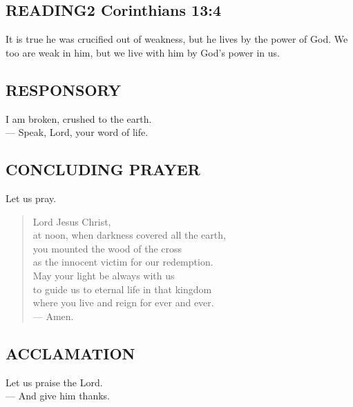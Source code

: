 \documentclass[12pt,twocolumn,letterpaper]{book}
\begin{document}
\subsection*{READING\hfill \normalsize 2 Corinthians 13:4}

It is true he was crucified out of weakness, but he lives by the power of God. We too are weak in him, but we live with him by God’s power in us.

\subsection*{RESPONSORY}
I am broken, crushed to the earth.\\
— Speak, Lord, your word of life.

\subsection*{CONCLUDING PRAYER}
Let us pray.

\begin{verse}
Lord Jesus Christ,\\
at noon, when darkness covered all the earth,\\
you mounted the wood of the cross\\
as the innocent victim for our redemption.\\
May your light be always with us\\
to guide us to eternal life in that kingdom\\
where you live and reign for ever and ever.\\
— Amen.
\end{verse}

\subsection*{ACCLAMATION}

Let us praise the Lord.\\
— And give him thanks.
\end{document}
